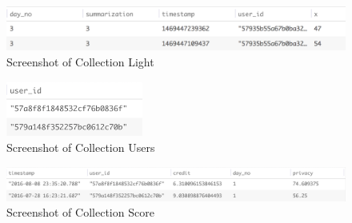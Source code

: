 \begin{figure}[ht!]
\centering
\includegraphics[width=\textwidth,keepaspectratio]{./images/collection_light}
\caption{Screenshot of Collection Light}
\label{fig:col_light}
\end{figure}

\begin{figure}[ht!]
\centering
\includegraphics[width=0.4\textwidth,keepaspectratio]{./images/collection_users}
\caption{Screenshot of Collection Users}
\label{fig:col_users}
\end{figure}

\begin{figure}[ht!]
\centering
\includegraphics[width=\textwidth,keepaspectratio]{./images/collection_score}
\caption{Screenshot of Collection Score}
\label{fig:col_score}
\end{figure}

